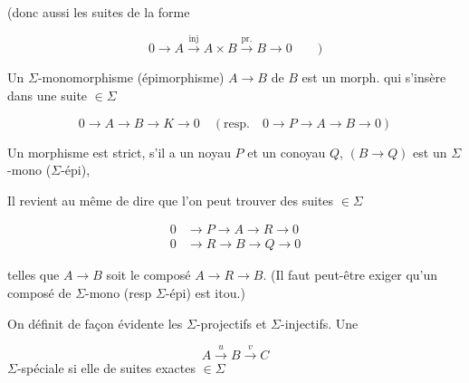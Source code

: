 (donc aussi les suites de la forme

\[
 0\longrightarrow A\xrightarrow{\mathrm{inj}}A\times B\xrightarrow{\mathrm{pr.}}B\longrightarrow0\qquad)
\]


Un $\Sigma$-monomorphisme (épimorphisme) $A\longrightarrow B$ de $B$ est un morph. qui s'insère dans une suite $\in\Sigma$

\[
 0\longrightarrow A\longrightarrow B\longrightarrow K\longrightarrow0\quad(\text{resp.}\quad0\longrightarrow P\longrightarrow A\longrightarrow B\longrightarrow0)
\]

Un morphisme   est \inserted{$\Sigma$-}strict, s'il a un noyau $P$ et un conoyau $Q$, \deleted{\unsure{et si|objet} $[\operatorname{Coim}\overset{\sim}{\longrightarrow}\operatorname{Im}$,}  $(B\longrightarrow Q)$ est un $\Sigma$-mono ($\Sigma$-épi),


Il revient au même de dire que l'on peut trouver des suites $\in\Sigma$

\[
 \begin{aligned}
 0&\longrightarrow P\longrightarrow A\longrightarrow R\longrightarrow0\\
 0&\longrightarrow R\longrightarrow B\longrightarrow Q\longrightarrow0
 \end{aligned}
\]

telles que $A\longrightarrow B$ soit le composé $A\to R\longrightarrow B$. (Il faut peut-être exiger qu'un composé de $\Sigma$-mono (resp $\Sigma$-épi) est itou.)

On définit de façon évidente les  $\Sigma$-projectifs et $\Sigma$-injectifs. Une  


\[
 A\xrightarrow{u}B\xrightarrow{v}C
\]
 $\Sigma$-spéciale  si elle   de suites exactes $\in\Sigma$

